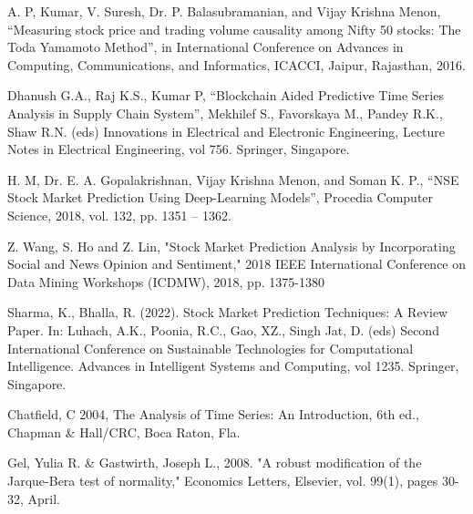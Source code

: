 \documentclass[conference]{IEEEtran}
\begin{document}
\begin{thebibliography}{00}
	 A. P, Kumar, V. Suresh, Dr. P. Balasubramanian, and Vijay Krishna Menon, “Measuring stock price and trading volume causality among Nifty 50 stocks: The Toda Yamamoto Method”, in International Conference on Advances in Computing, Communications, and Informatics, ICACCI, Jaipur, Rajasthan, 2016.
	
	 Dhanush G.A., Raj K.S., Kumar P, “Blockchain Aided Predictive Time Series Analysis in Supply Chain System”,  Mekhilef S., Favorskaya M., Pandey R.K., Shaw R.N. (eds) Innovations in Electrical and Electronic Engineering, Lecture Notes in Electrical Engineering, vol 756. Springer, Singapore.
	
	 H. M, Dr. E. A. Gopalakrishnan, Vijay Krishna Menon, and Soman K. P., “NSE Stock Market Prediction Using Deep-Learning Models”, Procedia Computer Science, 2018, vol. 132, pp. 1351 – 1362.
	
	 Z. Wang, S. Ho and Z. Lin, "Stock Market Prediction Analysis by Incorporating Social and News Opinion and Sentiment," 2018 IEEE International Conference on Data Mining Workshops (ICDMW), 2018, pp. 1375-1380
	
	 Sharma, K., Bhalla, R. (2022). Stock Market Prediction Techniques: A Review Paper. In: Luhach, A.K., Poonia, R.C., Gao, XZ., Singh Jat, D. (eds) Second International Conference on Sustainable Technologies for Computational Intelligence. Advances in Intelligent Systems and Computing, vol 1235. Springer, Singapore.
	
	 Chatfield, C 2004, The Analysis of Time Series: An Introduction, 6th ed., Chapman \& Hall/CRC, Boca Raton, Fla.
	
	 Gel, Yulia R. \& Gastwirth, Joseph L., 2008. "A robust modification of the Jarque-Bera test of normality," Economics Letters, Elsevier, vol. 99(1), pages 30-32, April.
	
	\end{thebibliography}
\end{document}
